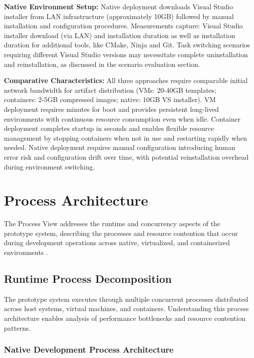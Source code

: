 \textbf{Native Environment Setup:} Native deployment downloads Visual Studio installer from LAN infrastructure (approximately 10GB) followed by manual installation and configuration procedures.
Measurements capture: Visual Studio installer download (via LAN) and installation duration as well as installation duration for additional tools, like CMake, Ninja and Git.
Task switching scenarios requiring different Visual Studio versions may necessitate complete uninstallation and reinstallation, as discussed in the scenario evaluation section.

\textbf{Comparative Characteristics:} All three approaches require comparable initial network bandwidth for artifact distribution (VMs: 20-40GB templates; containers: 2-5GB compressed images; native: 10GB VS installer).
VM deployment requires minutes for boot and provides persistent long-lived environments with continuous resource consumption even when idle.
Container deployment completes startup in seconds and enables flexible resource management by stopping containers when not in use and restarting rapidly when needed.
Native deployment requires manual configuration introducing human error risk and configuration drift over time, with potential reinstallation overhead during environment switching.

\section{Process Architecture}

The Process View addresses the runtime and concurrency aspects of the prototype system, describing the processes and resource contention that occur during development operations across native, virtualized, and containerized environments \citep{kruchten4+1ViewModel1995}.

\subsection{Runtime Process Decomposition}

The prototype system executes through multiple concurrent processes distributed across host systems, virtual machines, and containers.
Understanding this process architecture enables analysis of performance bottlenecks and resource contention patterns.

\subsubsection{Native Development Process Architecture}

